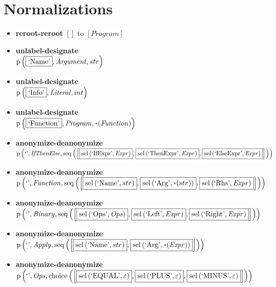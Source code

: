 \section{Normalizations}
{\footnotesize\begin{itemize}
\item \textbf{reroot-reroot} $\left[\right]$ to $\left[\mathit{Program}\right]$
\item \textbf{unlabel-designate}\\$\mathrm{p}\left(\fbox{\text{`Name'}},\mathit{Argument},str\right)$
\item \textbf{unlabel-designate}\\$\mathrm{p}\left(\fbox{\text{`Info'}},\mathit{Literal},int\right)$
\item \textbf{unlabel-designate}\\$\mathrm{p}\left(\fbox{\text{`Function'}},\mathit{Program},\star \left(\mathit{Function}\right)\right)$
\item \textbf{anonymize-deanonymize}\\$\mathrm{p}\left(\text{`'},\mathit{IfThenElse},\mathrm{seq}\left(\left[\fbox{$\mathrm{sel}\left(\text{`IfExpr'},\mathit{Expr}\right)$}, \fbox{$\mathrm{sel}\left(\text{`ThenExpr'},\mathit{Expr}\right)$}, \fbox{$\mathrm{sel}\left(\text{`ElseExpr'},\mathit{Expr}\right)$}\right]\right)\right)$
\item \textbf{anonymize-deanonymize}\\$\mathrm{p}\left(\text{`'},\mathit{Function},\mathrm{seq}\left(\left[\fbox{$\mathrm{sel}\left(\text{`Name'},str\right)$}, \fbox{$\mathrm{sel}\left(\text{`Arg'},\star \left(str\right)\right)$}, \fbox{$\mathrm{sel}\left(\text{`Rhs'},\mathit{Expr}\right)$}\right]\right)\right)$
\item \textbf{anonymize-deanonymize}\\$\mathrm{p}\left(\text{`'},\mathit{Binary},\mathrm{seq}\left(\left[\fbox{$\mathrm{sel}\left(\text{`Ops'},\mathit{Ops}\right)$}, \fbox{$\mathrm{sel}\left(\text{`Left'},\mathit{Expr}\right)$}, \fbox{$\mathrm{sel}\left(\text{`Right'},\mathit{Expr}\right)$}\right]\right)\right)$
\item \textbf{anonymize-deanonymize}\\$\mathrm{p}\left(\text{`'},\mathit{Apply},\mathrm{seq}\left(\left[\fbox{$\mathrm{sel}\left(\text{`Name'},str\right)$}, \fbox{$\mathrm{sel}\left(\text{`Arg'},\star \left(\mathit{Expr}\right)\right)$}\right]\right)\right)$
\item \textbf{anonymize-deanonymize}\\$\mathrm{p}\left(\text{`'},\mathit{Ops},\mathrm{choice}\left(\left[\fbox{$\mathrm{sel}\left(\text{`EQUAL'},\varepsilon\right)$}, \fbox{$\mathrm{sel}\left(\text{`PLUS'},\varepsilon\right)$}, \fbox{$\mathrm{sel}\left(\text{`MINUS'},\varepsilon\right)$}\right]\right)\right)$

\end{itemize}}

